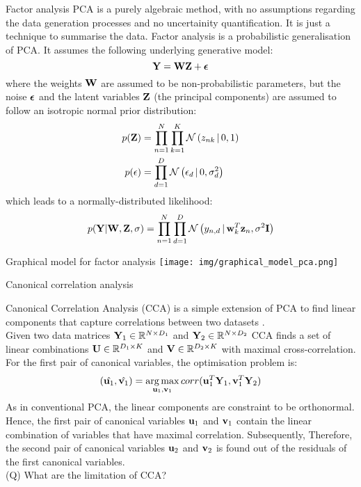 \documentclass[aspectratio=169,notes]{beamer}
\begin{document}
	\begin{frame}{Factor analysis}
	PCA is a purely algebraic method, with no assumptions regarding the data generation processes and no uncertainity quantification. It is just a technique to summarise the data. Factor analysis is a probabilistic generalisation of PCA. It assumes the following underlying generative model:
	\begin{equation}
		{\bf Y} = {\bf W} {\bf Z} + \mbox{\boldmath $\epsilon$}
	\end{equation}
	where the weights ${\bf W}$ are assumed to be non-probabilistic parameters, but the noise $\mbox{\boldmath $\epsilon$}$ and the latent variables ${\bf Z}$ (the principal components) are assumed to follow an isotropic normal prior distribution:
	\begin{align*}
		p({\bf Z}) &= \prod_{n=1}^{N} \prod_{k=1}^{K} \mathcal{N}\left(z_{nk} \,|\, 0,1\right) \\
		p(\epsilon) &= \prod_{d=1}^{D} \mathcal{N}\left(\epsilon_d \,|\, 0,\sigma_{d}^{2}\right)
	\end{align*}
	which leads to a normally-distributed likelihood:
	\begin{equation}
		p({\bf Y}|{\bf W},{\bf Z},\sigma) = \prod_{n=1}^{N} \prod_{d=1}^{D} \mathcal{N}\left(y_{n,d} \,|\, {\bf w}_{k}^T {\bf z}_{n},\sigma^2 {\bf I}\right)
	\end{equation}
	\end{frame}

	\begin{frame}{Graphical model for factor analysis}
	\texttt{[image: img/graphical\_model\_pca.png]}
	\end{frame}


	\begin{frame}{Canonical correlation analysis}

	Canonical Correlation Analysis (CCA) is a simple extension of PCA to find linear components that capture correlations between two datasets \cite{Hotteling1936,Hardle2007}.\\
	Given two data matrices ${\bf Y}_1 \in \mathbb{R}^{N \times D_1}$ and ${\bf Y}_2 \in \mathbb{R}^{N \times D_2}$ CCA finds a set of linear combinations ${\bf U} \in \mathbb{R}^{D_1 \times K}$ and ${\bf V} \in \mathbb{R}^{D_2 \times K}$ with maximal cross-correlation.\\ For the first pair of canonical variables, the optimisation problem is:
	\begin{equation}
		(\hat{{\bf u}_1}, \hat{{\bf v}_1}) = \operatorname*{arg\,max}_{{\bf u}_1,{\bf v}_1} corr({\bf u}_{1}^T {\bf Y}_1, {\bf v}_{1}^T {\bf Y}_2)
	\end{equation}
	As in conventional PCA, the linear components are constraint to be orthonormal. Hence, the first pair of canonical variables ${\bf u}_1$ and ${\bf v}_1$ contain the linear combination of variables that have maximal correlation. Subsequently, Therefore, the second pair of canonical variables ${\bf u}_2$ and ${\bf v}_2$ is found out of the residuals of the first canonical variables.\\
	(Q) What are the limitation of CCA?
	\end{frame}
\end{document}
